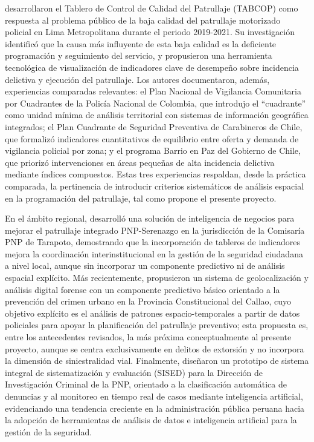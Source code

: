 \documentclass[12pt,letterpaper]{report}
\begin{document}
\citet{sanchezguevara2022tabcop} desarrollaron el Tablero de Control de Calidad del Patrullaje (TABCOP) como respuesta al problema p\'ublico de la baja calidad del patrullaje motorizado policial en Lima Metropolitana durante el periodo 2019-2021. Su investigaci\'on identific\'o que la causa m\'as influyente de esta baja calidad es la deficiente programaci\'on y seguimiento del servicio, y propusieron una herramienta tecnol\'ogica de visualizaci\'on de indicadores clave de desempe\~no sobre incidencia delictiva y ejecuci\'on del patrullaje. Los autores documentaron, adem\'as, experiencias comparadas relevantes: el Plan Nacional de Vigilancia Comunitaria por Cuadrantes de la Polic\'ia Nacional de Colombia, que introdujo el ``cuadrante'' como unidad m\'inima de an\'alisis territorial con sistemas de informaci\'on geogr\'afica integrados; el Plan Cuadrante de Seguridad Preventiva de Carabineros de Chile, que formaliz\'o indicadores cuantitativos de equilibrio entre oferta y demanda de vigilancia policial por zona; y el programa Barrio en Paz del Gobierno de Chile, que prioriz\'o intervenciones en \'areas peque\~nas de alta incidencia delictiva mediante \'indices compuestos. Estas tres experiencias respaldan, desde la pr\'actica comparada, la pertinencia de introducir criterios sistem\'aticos de an\'alisis espacial en la programaci\'on del patrullaje, tal como propone el presente proyecto.

En el \'ambito regional, \citet{flores2017patrullaje} desarroll\'o una soluci\'on de inteligencia de negocios para mejorar el patrullaje integrado PNP-Serenazgo en la jurisdicci\'on de la Comisar\'ia PNP de Tarapoto, demostrando que la incorporaci\'on de tableros de indicadores mejora la coordinaci\'on interinstitucional en la gesti\'on de la seguridad ciudadana a nivel local, aunque sin incorporar un componente predictivo ni de an\'alisis espacial expl\'icito. M\'as recientemente, \citet{talla2025geolocalizacion} propusieron un sistema de geolocalizaci\'on y an\'alisis digital forense con un componente predictivo b\'asico orientado a la prevenci\'on del crimen urbano en la Provincia Constitucional del Callao, cuyo objetivo expl\'icito es el an\'alisis de patrones espacio-temporales a partir de datos policiales para apoyar la planificaci\'on del patrullaje preventivo; esta propuesta es, entre los antecedentes revisados, la m\'as pr\'oxima conceptualmente al presente proyecto, aunque se centra exclusivamente en delitos de extorsi\'on y no incorpora la dimensi\'on de siniestralidad vial. Finalmente, \citet{ramosespinoza2025sised} dise\~naron un prototipo de sistema integral de sistematizaci\'on y evaluaci\'on (SISED) para la Direcci\'on de Investigaci\'on Criminal de la PNP, orientado a la clasificaci\'on autom\'atica de denuncias y al monitoreo en tiempo real de casos mediante inteligencia artificial, evidenciando una tendencia creciente en la administraci\'on p\'ublica peruana hacia la adopci\'on de herramientas de an\'alisis de datos e inteligencia artificial para la gesti\'on de la seguridad.
\end{document}

